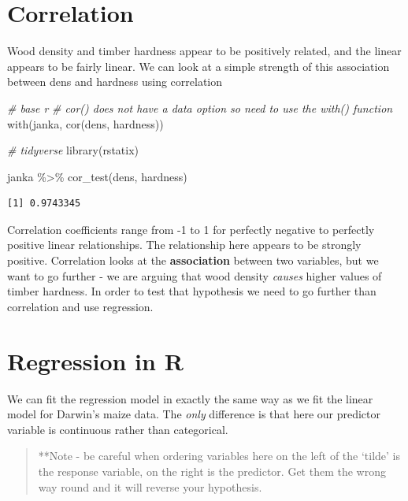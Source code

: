\documentclass[
]{book}
\newenvironment{Shaded}{\begin{snugshade}}{\end{snugshade}}
\newcommand{\CommentTok}[1]{\textcolor[rgb]{0.56,0.35,0.01}{\textit{#1}}}
\newcommand{\FunctionTok}[1]{\textcolor[rgb]{0.00,0.00,0.00}{#1}}
\newcommand{\NormalTok}[1]{#1}
\newcommand{\SpecialCharTok}[1]{\textcolor[rgb]{0.00,0.00,0.00}{#1}}
\begin{document}
\hypertarget{correlation}{%
\section{Correlation}\label{correlation}}

Wood density and timber hardness appear to be positively related, and the linear appears to be fairly linear. We can look at a simple strength of this association between dens and hardness using correlation

\begin{Shaded}
\begin{Highlighting}[]
\CommentTok{\# base r}
\CommentTok{\# cor() does not have a data option so need to use the with() function}
\FunctionTok{with}\NormalTok{(janka, }\FunctionTok{cor}\NormalTok{(dens, hardness))}

\CommentTok{\# tidyverse}
\FunctionTok{library}\NormalTok{(rstatix)}

\NormalTok{janka }\SpecialCharTok{\%\textgreater{}\%} 
  \FunctionTok{cor\_test}\NormalTok{(dens, hardness)}
\end{Highlighting}
\end{Shaded}

\begin{verbatim}
[1] 0.9743345
\end{verbatim}

Correlation coefficients range from -1 to 1 for perfectly negative to perfectly positive linear relationships. The relationship here appears to be strongly positive. Correlation looks at the \textbf{association} between two variables, but we want to go further - we are arguing that wood density \emph{causes} higher values of timber hardness. In order to test that hypothesis we need to go further than correlation and use regression.

\hypertarget{regression-in-r}{%
\section{Regression in R}\label{regression-in-r}}

We can fit the regression model in exactly the same way as we fit the linear model for Darwin's maize data. The \emph{only} difference is that here our predictor variable is continuous rather than categorical.

\begin{quote}
**Note - be careful when ordering variables here on the left of the `tilde' is the response variable, on the right is the predictor. Get them the wrong way round and it will reverse your hypothesis.
\end{quote}
\end{document}
